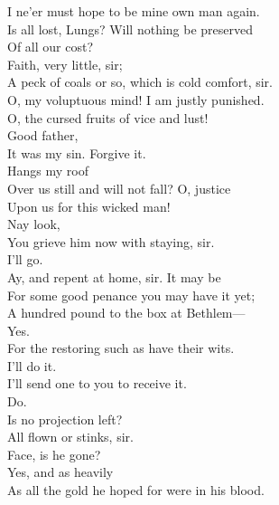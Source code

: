 \documentclass[a4paper,oneside,12pt]{memoir}
\begin{document}
\begin{drama*}
I ne'er must hope to be mine own man again.\\
\mammonspeaks Is all lost, Lungs? Will nothing be preserved\\
Of all our cost?\\
\facespeaks {} Faith, very little, sir;\\
A peck of coals or so, which is cold comfort, sir.\\
\mammonspeaks O, my voluptuous mind! I am justly punished.\\
\subtlespeaks O, the cursed fruits of vice and lust!\\
\mammonspeaks {} Good father,\\
It was my sin. Forgive it.\\
\subtlespeaks {} Hangs my roof\\
Over us still and will not fall? O, justice\\
Upon us for this wicked man!\\
\facespeaks {} Nay look,\\
You grieve him now with staying, sir.\\
\mammonspeaks {} I'll go.\\
\facespeaks Ay, and repent at home, sir. It may be\\
For some good penance you may have it yet;\\
A hundred pound to the box at Bethlem---\\
\mammonspeaks Yes.\\
\facespeaks {} For the restoring such as have their wits.\\
\mammonspeaks I'll do it.\\
\facespeaks {} I'll send one to you to receive it.\\
\mammonspeaks {} Do.\\
Is no projection left?\\
\facespeaks {} All flown or stinks, sir.\\
\subtlespeaks Face, is he gone?\\
\facespeaks {} Yes, and as heavily\\
As all the gold he hoped for were in his blood.\\

\end{drama*}
\end{document}

